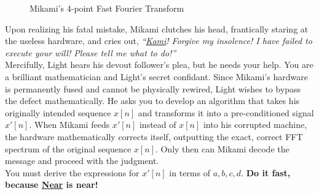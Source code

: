 \documentclass[12pt]{article}
\begin{document}
\begin{figure}[H]
\centering


\caption{Mikami's 4-point Fast Fourier Transform}
\end{figure}

Upon realizing his fatal mistake, Mikami clutches his head, frantically staring at the useless hardware, and cries out, \emph{``\href{https://en.wikipedia.org/wiki/Kami}{Kami}! Forgive my insolence! I have failed to execute your will! Please tell me what to do!''}\\

Mercifully, Light hears his devout follower's plea, but he needs your help. You are a brilliant mathematician and Light's secret confidant. Since Mikami's hardware is permanently fused and cannot be physically rewired, Light wishes to bypass the defect mathematically. He asks you to develop an algorithm that takes his originally intended sequence $x[n]$ and transforms it into a pre-conditioned signal $x'[n]$. When Mikami feeds $x'[n]$ instead of $x[n]$ into his corrupted machine, the hardware mathematically corrects itself, outputting the exact, correct FFT spectrum of the original sequence $x[n]$. Only then can Mikami decode the message and proceed with the judgment.\\

You must derive the expressions for $x'[n]$ in terms of $a, b, c, d$. \textbf{Do it fast, because \href{https://deathnote.fandom.com/wiki/Near}{Near} is near!}
\end{document}
